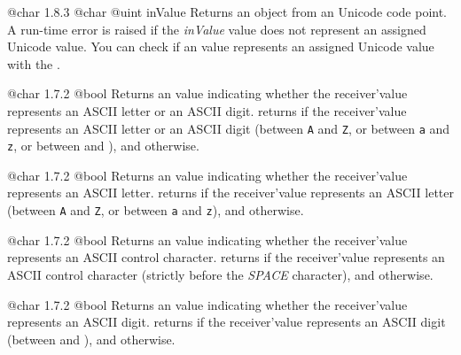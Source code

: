 {@char}
{1.8.3}
{@char}
{@uint inValue}
{Returns an  object from an Unicode code point.}
{A run-time error is raised if the \emph{inValue} value does not represent an assigned Unicode value. You can check if an  value represents an assigned Unicode value with the .}




{@char}
{1.7.2}
{@bool}
{Returns an  value indicating whether the receiver'value represents an ASCII letter or an ASCII digit.}
{returns  if the receiver'value represents an ASCII letter or an ASCII digit (between \texttt{\textquotesingle A\textquotesingle} and \texttt{\textquotesingle Z\textquotesingle}, or between \texttt{\textquotesingle a\textquotesingle} and \texttt{\textquotesingle z\textquotesingle}, or between \texttt{\textquotesingle} and \texttt{\textquotesingle}), and  otherwise.}




{@char}
{1.7.2}
{@bool}
{Returns an  value indicating whether the receiver'value represents an ASCII letter.}
{returns  if the receiver'value represents an ASCII letter (between \texttt{\textquotesingle A\textquotesingle} and \texttt{\textquotesingle Z\textquotesingle}, or between \texttt{\textquotesingle a\textquotesingle} and \texttt{\textquotesingle z\textquotesingle}), and  otherwise.}




{@char}
{1.7.2}
{@bool}
{Returns an  value indicating whether the receiver'value represents an ASCII control character.}
{returns  if the receiver'value represents an ASCII control character (strictly before the \emph{SPACE} character), and  otherwise.}





{@char}
{1.7.2}
{@bool}
{Returns an  value indicating whether the receiver'value represents an ASCII digit.}
{returns  if the receiver'value represents an ASCII digit (between \texttt{\textquotesingle} and \texttt{\textquotesingle}), and  otherwise.}





